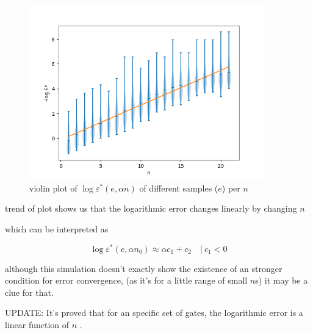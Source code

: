 \documentclass[11pt]{article}
\begin{document}
\begin{figure}[H]
\centering
\includegraphics[width=0.9\textwidth]{errors.png}
\caption{violin plot of $\log\varepsilon^*(e, \alpha n)$ of different samples ($e$) per $n$}
\end{figure}

trend of plot shows us that the logarithmic error changes linearly by changing $n$

which can be interpreted as

\begin{equation} \log\varepsilon^*(e, \alpha n_0) \approx \alpha c_1 + c_2 \quad |~ c_1 < 0 
\end{equation}

although this simulation doesn't exactly show the existence of an stronger condition for error convergence, (as it's for a little range of small $n$s) it may be a clue for that.

UPDATE: It's proved that for an specific set of gates, the logarithmic error is a linear function of $n$ \cite{harrow}.
\end{document}
